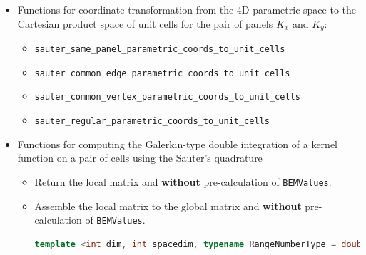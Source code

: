 \documentclass[11pt, a4paper]{book}
\begin{document}
\begin{itemize}
\item Functions for coordinate transformation from the 4D parametric space to the Cartesian product
  space of unit cells for the pair of panels $K_x$ and $K_y$:
  \begin{itemize}
  \item \texttt{sauter\_same\_panel\_parametric\_coords\_to\_unit\_cells}
  \item \texttt{sauter\_common\_edge\_parametric\_coords\_to\_unit\_cells}
  \item \texttt{sauter\_common\_vertex\_parametric\_coords\_to\_unit\_cells}
  \item \texttt{sauter\_regular\_parametric\_coords\_to\_unit\_cells}
  \end{itemize}
\item Functions for computing the Galerkin-type double integration of a kernel function on a pair of
  cells using the Sauter's quadrature
  \begin{itemize}
  \item Return the local matrix and \textbf{without} pre-calculation of \texttt{BEMValues}.
  \item Assemble the local matrix to the global matrix and \textbf{without} pre-calculation of \texttt{BEMValues}.
    \begin{lstlisting}[language=C++]
      template <int dim, int spacedim, typename RangeNumberType = double> void SauterQuadRule( FullMatrix<RangeNumberType> &system_matrix, const LaplaceKernel::KernelFunction<spacedim, RangeNumberType> & kernel_function, const typename DoFHandler<dim, spacedim>::cell_iterator &kx_cell_iter, const typename DoFHandler<dim, spacedim>::cell_iterator &ky_cell_iter, const MappingQGeneric<dim, spacedim> & kx_mapping = MappingQGeneric<dim, spacedim>(1), const MappingQGeneric<dim, spacedim> &ky_mapping = MappingQGeneric<dim, spacedim>(1))

\end{lstlisting}
\end{itemize}
\end{itemize}
\end{document}
